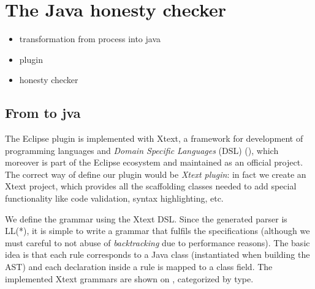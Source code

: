 
\section{The Java honesty checker}\label{sec:java-honesty}

\begin{itemize}
\item transformation from \coco process into java 
\item \coco plugin
\item honesty checker
\end{itemize}


\subsection{From \coco to jva }
The \coco Eclipse plugin is implemented with Xtext, a framework for development of programming languages and \textit{Domain Specific Languages} (DSL) (), which moreover is part of the Eclipse ecosystem and maintained as an official project. The correct way of define our plugin would be \textit{Xtext plugin}: in fact we create an Xtext project, which provides all the scaffolding classes needed to add special functionality like code validation, syntax highlighting, etc.


We define the \coco grammar using the Xtext DSL. Since the generated parser is LL(*), it is simple to write a grammar that fulfils the \coco specifications (although we must careful to not abuse of \textit{backtracking} due to performance reasons). The basic idea is that each rule corresponds to a Java class (instantiated when building the AST) and each declaration inside a rule is mapped to a class field. The implemented Xtext grammars are shown on , categorized by type.
